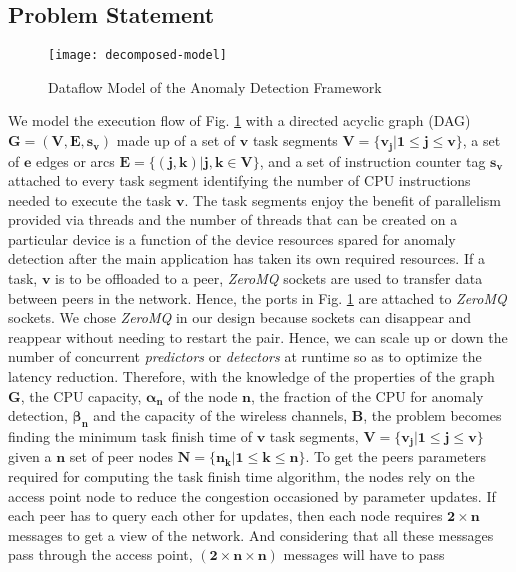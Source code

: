 \subsection{Problem Statement}
\label{subsec:problem-formulation}
\begin{figure}[!t]
	\centering
	\texttt{[image: decomposed-model]}
	\caption{Dataflow Model of the Anomaly 
		Detection Framework}
	\label{fig:dataflow-model}
\end{figure}
We model the execution flow of Fig. \ref{fig:dataflow-model} 
with a directed acyclic graph (DAG) $ \bm{G=(V,E,s_v)} 
$ made up of a set of $ \bm{v} $ task segments $ {
\bm{V=\{v_j|1\leq j\leq v\}}} $, a set of $ \bm{e} $ edges or 
arcs 
$ \bm{E=\{(j,k)|j,k \in V\}} $, and a set of instruction 
counter tag $ \bm{s_v} $ attached to every task segment 
identifying the number of CPU instructions needed to execute 
the task $ \bm{v} $. The task segments enjoy the benefit of 
parallelism provided via threads and the number of threads 
that can be created on a particular device is a function of 
the device resources spared for anomaly detection after the 
main application has taken its own required resources. If a 
task, $ \bm{v} $ is to be offloaded to a peer, \emph{ZeroMQ} 
sockets are used to transfer data between peers in the 
network. Hence, the ports in Fig. \ref{fig:dataflow-model} 
are attached to \emph{ZeroMQ} sockets. We chose \emph{ZeroMQ} 
in our design because sockets can disappear and reappear 
without needing to restart the pair. Hence, we can scale up 
or down the number of concurrent \emph{predictors} or 
\emph{detectors} at runtime so as to optimize the latency 
reduction. Therefore, with the knowledge of the properties of 
the graph $ \bm{G} $, the CPU capacity, $ \bm{\alpha_n} $ of 
the node $ \bm{n} $, the 
fraction of the CPU for anomaly detection, $ \bm{\beta_n} $ 
and 
the capacity of the wireless channels, $ \bm{B} $, the 
problem becomes finding the minimum task finish time of $ 
\bm{v} $ task segments, ${ \bm{V=\{v_j|1\leq j \leq v\}}} $ 
given a $ \bm{n} $ set of peer nodes ${ \bm{N=\{n_k|1 \leq k 
\leq n\}}} $. To get the peers parameters required for 
computing the task finish time algorithm, the nodes 
rely on the access point node to reduce the congestion 
occasioned by parameter updates. If each peer has to query 
each other for updates, then each node requires $ \bm{2 
\times n} $ messages to get a view of the network. And 
considering that all these messages pass through the access 
point, ${ \bm{(2\times n\times n)}} $ messages will have to 
pass 
